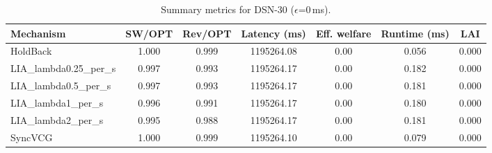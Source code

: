 \begin{table}[t]
\centering
\small
\setlength{\tabcolsep}{6pt}
\begin{tabular}{lcccccc}
\toprule
Mechanism & SW/OPT & Rev/OPT & Latency (ms) & Eff. welfare & Runtime (ms) & LAI \\
\midrule
HoldBack & 1.000 & 0.999 & 1195264.08 & 0.00 & 0.056 & 0.000 \\
LIA_lambda0.25_per_s & 0.997 & 0.993 & 1195264.17 & 0.00 & 0.182 & 0.000 \\
LIA_lambda0.5_per_s & 0.997 & 0.993 & 1195264.17 & 0.00 & 0.181 & 0.000 \\
LIA_lambda1_per_s & 0.996 & 0.991 & 1195264.17 & 0.00 & 0.180 & 0.000 \\
LIA_lambda2_per_s & 0.995 & 0.988 & 1195264.17 & 0.00 & 0.181 & 0.000 \\
SyncVCG & 1.000 & 0.999 & 1195264.10 & 0.00 & 0.079 & 0.000 \\
\bottomrule
\end{tabular}
\caption{Summary metrics for DSN-30 ($\epsilon$=0\,ms).}
\label{tab:dsn30_eps0p0}
\end{table}
